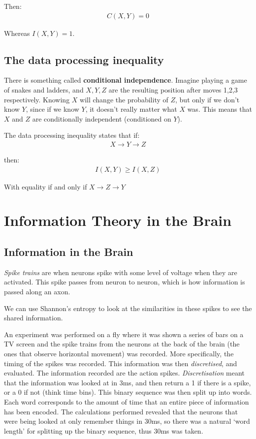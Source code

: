 \documentclass[11pt,a4paper,titlepage,dvipsnames,cmyk]{scrartcl}
\begin{document}
Then:
\begin{align*}
C(X,Y) = 0
\end{align*}

Whereas $I(X,Y) = 1$.

\subsection{The data processing inequality}
There is something called \textbf{conditional independence}. Imagine playing a game of snakes and ladders, and $X,Y,Z$ are the resulting position after moves 1,2,3 respectively. Knowing $X$ will change the probability of $Z$, but only if we don't know $Y$, since if we know $Y$, it doesn't really matter what $X$ was. This means that $X$ and $Z$ are conditionally independent (conditioned on $Y$).

The data processing inequality states that if:
\begin{align*}
X \rightarrow Y \rightarrow Z
\end{align*}

then:
\begin{align*}
I(X,Y) \ge I(X,Z)
\end{align*}

With equality if and only if $X \rightarrow Z \rightarrow Y$

\section{Information Theory in the Brain}
\subsection{Information in the Brain}
\textit{Spike trains} are when neurons spike with some level of voltage when they are activated. This spike passes from neuron to neuron, which is how information is passed along an axon.

We can use Shannon's entropy to look at the similarities in these spikes to see the shared information.

An experiment was performed on a fly where it was shown a series of bars on a TV screen and the spike trains from the neurons at the back of the brain (the ones that observe horizontal movement) was recorded. More specifically, the timing of the spikes was recorded. This information was then \textit{discretised}, and evaluated. The information recorded are the action spikes. \textit{Discretisation} meant that the information was looked at in 3ms, and then return a 1 if there is a spike, or a 0 if not (think time bins). This binary sequence was then split up into words. Each word corresponds to the amount of time that an entire piece of information has been encoded. The calculations performed revealed that the neurons that were being looked at only remember things in 30ms, so there was a natural `word length' for splitting up the binary sequence, thus 30ms was taken.
\end{document}
